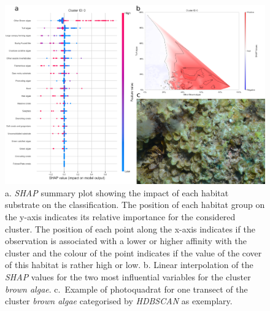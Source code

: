 \begin{figure}
\hypertarget{fig:chap2figS20}{%
\centering
\includegraphics{03-Chapitre2/figures/supplementary/05-explanation_shap_pq_cluster_0.png}
\caption{a. \emph{SHAP} summary plot showing the impact of each habitat
substrate on the classification. The position of each habitat group on
the y-axis indicates its relative importance for the considered cluster.
The position of each point along the x-axis indicates if the observation
is associated with a lower or higher affinity with the cluster and the
colour of the point indicates if the value of the cover of this habitat
is rather high or low. b. Linear interpolation of the \emph{SHAP} values
for the two most influential variables for the cluster \emph{brown
algae}. c.~Example of photoquadrat for one transect of the cluster
\emph{brown algae} categorised by \emph{HDBSCAN} as
exemplary.}\label{fig:chap2figS20}
}
\end{figure}


